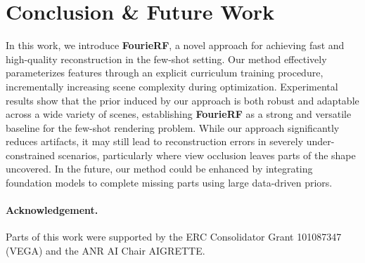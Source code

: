 \section{Conclusion \& Future Work}

In this work, we introduce \textbf{FourieRF}, a novel approach for achieving fast and high-quality reconstruction in the few-shot setting. Our method effectively parameterizes features through an explicit curriculum training procedure, incrementally increasing scene complexity during optimization. Experimental results show that the prior induced by our approach is both robust and adaptable across a wide variety of scenes, establishing \textbf{FourieRF} as a strong and versatile baseline for the few-shot rendering problem. While our approach significantly reduces artifacts, it may still lead to reconstruction errors in severely under-constrained scenarios, particularly where view occlusion leaves parts of the shape uncovered.  In the future, our method could be enhanced by integrating foundation models to complete missing parts using large data-driven priors.

\paragraph{Acknowledgement.} Parts of this work were supported by the ERC Consolidator Grant 101087347 (VEGA) and the ANR AI Chair AIGRETTE.

